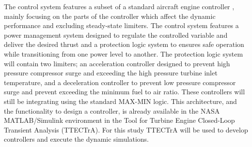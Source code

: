 
The control system features a subset of a standard aircraft engine controller 
\cite{Csank:2010}, mainly focusing on the parts of the controller which affect 
the dynamic performance and excluding steady-state limiters.  The control 
system features a power management system designed to regulate the 
controlled variable and deliver the desired thrust and a protection logic system 
to ensures safe operation while transitioning from one power level to another.  
The protection logic system will contain two limiters; an acceleration controller 
designed to prevent high pressure compressor surge and exceeding the high 
pressure turbine inlet temperature, and a deceleration controller to prevent low 
pressure compressor surge and prevent exceeding the minimum fuel to air ratio. 
These controllers will still be integrating using the standard MAX-MIN logic. 
This architecture, and the functionality to design a controller, is already 
available in the NASA MATLAB/Simulink environment in the Tool for Turbine 
Engine Closed-Loop Transient Analysis \cite{Csank:2014} (TTECTrA). For this 
study TTECTrA will be used to develop controllers and execute the dynamic 
simulations.